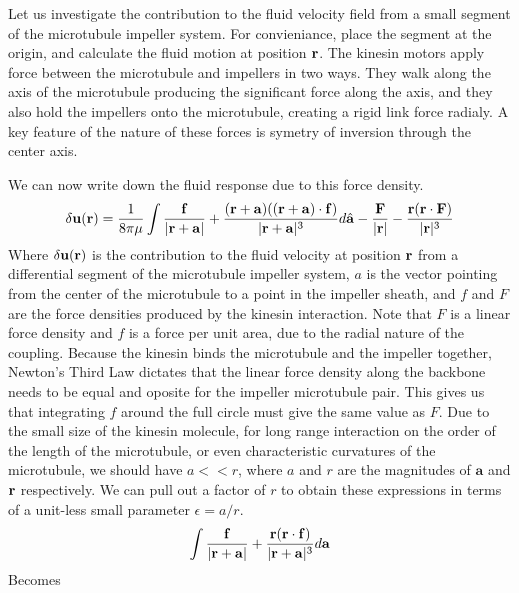 \documentclass[11pt]{ucthesis}
\def\br{{\bf r}}
\begin{document}
{Let us investigate the contribution to the fluid velocity field from a small segment of the microtubule impeller system. For convieniance, place the segment at the origin, and calculate the fluid motion at position $\br$. The kinesin motors apply force between the microtubule and impellers in two ways. They walk along the axis of the microtubule producing the significant force along the axis, and they also hold the impellers onto the microtubule, creating a rigid link force radialy. A key feature of the nature of these forces is symetry of inversion through the center axis.

We can now write down the fluid response due to this force density.
\begin{equation}
\label{eq:forcedensitystart}
\delta \mathbf{u}(\br) = \frac{1}{8\pi\mu}\int \frac{ \mathbf{f}}{|\br +  \mathbf{a}|} + \frac{(\br+ \mathbf{a}) ((\br +  \mathbf{a}) \cdot  \mathbf{f})}{|\br +  \mathbf{a}|^3} d\hat{ \mathbf{a}} - \frac{ \mathbf{F}}{|\br|} - \frac{\br (\br \cdot  \mathbf{F})}{|\br|^3}
\end{equation}
Where $\delta  \mathbf{u}(\br)$ is the contribution to the fluid velocity at position $\br$ from a differential segment of the microtubule impeller system, $a$ is the vector pointing from the center of the microtubule to a point in the impeller sheath, and $f$ and $F$ are the force densities produced by the kinesin interaction. Note that $F$ is a linear force density and $f$ is a force per unit area, due to the radial nature of the coupling.
Because the kinesin binds the microtubule and the impeller together, Newton's Third Law dictates that the linear force density along the backbone needs to be equal and oposite for the impeller microtubule pair. This gives us that integrating $f$ around the full circle must give the same value as $F$.
Due to the small size of the kinesin molecule, for long range interaction on the order of the length of the microtubule, or even characteristic curvatures of the microtubule, we should have $a << r$, where $a$ and $r$ are the magnitudes of $ \mathbf{a}$ and $\br$ respectively. We can pull out a factor of $r$ to obtain these expressions in terms of a unit-less small parameter $\epsilon = a/r$.
\begin{equation}
\label{eq:forcedensitycircleonly}
\int \frac{ \mathbf{f}}{|\br +  \mathbf{a}|} + \frac{\br (\br \cdot  \mathbf{f})}{|\br +  \mathbf{a}|^3} d \mathbf{a}
\end{equation}
Becomes
\begin{equation}
\label{eq:forcedensityepsilon}

\end{equation}}
\end{document}
